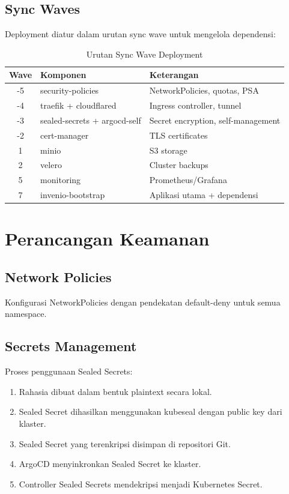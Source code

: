 \subsection{Sync Waves}

Deployment diatur dalam urutan sync wave untuk mengelola dependensi:

\begin{table}[H]
\centering
\caption{Urutan Sync Wave Deployment}
\begin{tabular}{|c|l|l|}
\hline
\textbf{Wave} & \textbf{Komponen} & \textbf{Keterangan} \\
\hline
-5 & security-policies & NetworkPolicies, quotas, PSA \\
-4 & traefik + cloudflared & Ingress controller, tunnel \\
-3 & sealed-secrets + argocd-self & Secret encryption, self-management \\
-2 & cert-manager & TLS certificates \\
1 & minio & S3 storage \\
2 & velero & Cluster backups \\
5 & monitoring & Prometheus/Grafana \\
7 & invenio-bootstrap & Aplikasi utama + dependensi \\
\hline
\end{tabular}
\end{table}

\section{Perancangan Keamanan}

\subsection{Network Policies}

Konfigurasi NetworkPolicies dengan pendekatan default-deny untuk semua namespace.

\subsection{Secrets Management}

Proses penggunaan Sealed Secrets:

\begin{enumerate}
    \item Rahasia dibuat dalam bentuk plaintext secara lokal.
    \item Sealed Secret dihasilkan menggunakan kubeseal dengan public key dari klaster.
    \item Sealed Secret yang terenkripsi disimpan di repositori Git.
    \item ArgoCD menyinkronkan Sealed Secret ke klaster.
    \item Controller Sealed Secrets mendekripsi menjadi Kubernetes Secret.
\end{enumerate}
